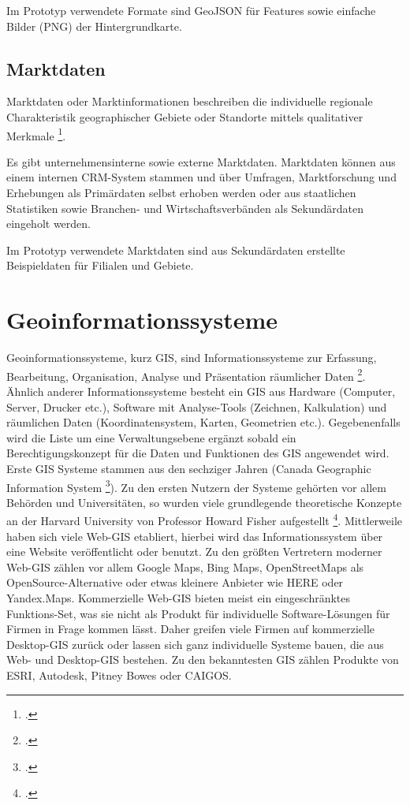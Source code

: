 Im Prototyp verwendete Formate sind GeoJSON für Features sowie einfache Bilder (PNG) der Hintergrundkarte.

\subsection{Marktdaten}
Marktdaten oder Marktinformationen beschreiben die individuelle regionale Charakteristik geographischer Gebiete oder Standorte mittels qualitativer Merkmale \footcite{geomarketing_marktdaten}.

Es gibt unternehmensinterne sowie externe Marktdaten.
Marktdaten können aus einem internen CRM-System stammen und über Umfragen, Marktforschung und Erhebungen als Primärdaten selbst erhoben werden oder aus staatlichen Statistiken sowie Branchen- und Wirtschaftsverbänden als Sekundärdaten eingeholt werden.

Im Prototyp verwendete Marktdaten sind aus Sekundärdaten erstellte Beispieldaten für Filialen und Gebiete.

\section{Geoinformationssysteme}
\label{sec:gis}
Geoinformationssysteme, kurz GIS, sind Informationssysteme zur Erfassung, Bearbeitung, Organisation, Analyse und Präsentation räumlicher Daten \footcite{geomarketing_gis}.  
Ähnlich anderer Informationssysteme besteht ein GIS aus Hardware (Computer, Server, Drucker etc.), Software mit Analyse-Tools (Zeichnen, Kalkulation) und räumlichen Daten (Koordinatensystem, Karten, Geometrien etc.). 
Gegebenenfalls wird die Liste um eine Verwaltungsebene ergänzt sobald ein Berechtigungskonzept für die Daten und Funktionen des GIS angewendet wird.
Erste GIS Systeme stammen aus den sechziger Jahren (Canada Geographic Information System \footcite{esri_cgis}). 
Zu den ersten Nutzern der Systeme gehörten vor allem Behörden und Universitäten, so wurden viele grundlegende theoretische Konzepte an der Harvard University von Professor Howard Fisher aufgestellt \footcite{gis_harvard_2005}.
Mittlerweile haben sich viele Web-GIS etabliert, hierbei wird das Informationssystem über eine Website veröffentlicht oder benutzt. 
Zu den größten Vertretern moderner Web-GIS zählen vor allem Google Maps, Bing Maps, OpenStreetMaps als OpenSource-Alternative oder etwas kleinere Anbieter wie HERE oder Yandex.Maps.
Kommerzielle Web-GIS bieten meist ein eingeschränktes Funktions-Set, was sie nicht als Produkt für individuelle Software-Lösungen für Firmen in Frage kommen lässt. Daher greifen viele Firmen auf kommerzielle Desktop-GIS zurück oder lassen sich ganz individuelle Systeme bauen, die aus Web- und Desktop-GIS bestehen.
Zu den bekanntesten GIS zählen Produkte von ESRI, Autodesk, Pitney Bowes oder CAIGOS. 

